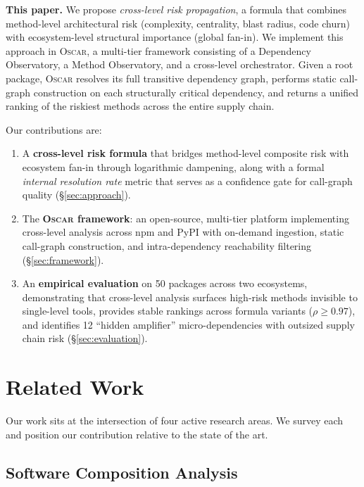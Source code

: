 \documentclass[conference]{IEEEtran}
\begin{document}
\textbf{This paper.} We propose \emph{cross-level risk propagation}, a formula that combines method-level architectural risk (complexity, centrality, blast radius, code churn) with ecosystem-level structural importance (global fan-in). We implement this approach in \textsc{Oscar}, a multi-tier framework consisting of a Dependency Observatory, a Method Observatory, and a cross-level orchestrator. Given a root package, \textsc{Oscar} resolves its full transitive dependency graph, performs static call-graph construction on each structurally critical dependency, and returns a unified ranking of the riskiest methods across the entire supply chain.

Our contributions are:
\begin{enumerate}
    \item A \textbf{cross-level risk formula} that bridges method-level composite risk with ecosystem fan-in through logarithmic dampening, along with a formal \emph{internal resolution rate} metric that serves as a confidence gate for call-graph quality (§\ref{sec:approach}).
    \item The \textbf{\textsc{Oscar} framework}: an open-source, multi-tier platform implementing cross-level analysis across npm and PyPI with on-demand ingestion, static call-graph construction, and intra-dependency reachability filtering (§\ref{sec:framework}).
    \item An \textbf{empirical evaluation} on 50 packages across two ecosystems, demonstrating that cross-level analysis surfaces high-risk methods invisible to single-level tools, provides stable rankings across formula variants ($\rho \geq 0.97$), and identifies 12 ``hidden amplifier'' micro-dependencies with outsized supply chain risk (§\ref{sec:evaluation}).
\end{enumerate}

\section{Related Work}
\label{sec:related}

Our work sits at the intersection of four active research areas. We survey each and position our contribution relative to the state of the art.

\subsection{Software Composition Analysis}
\end{document}
